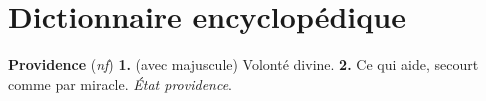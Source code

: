 
\section{Dictionnaire encyclopédique}

{\bf Providence} ({\it nf\;}) {\bf 1.} {\footnotesize(avec majuscule)} Volonté divine. {\bf 2.} Ce qui aide, secourt comme par miracle. {\it État providence}.

